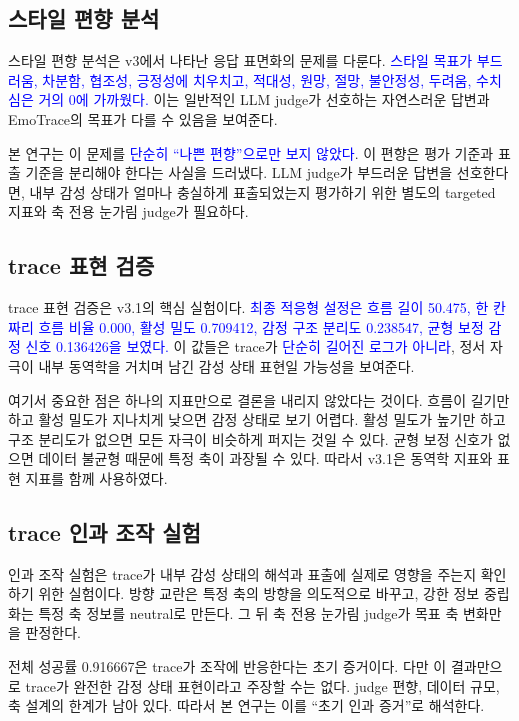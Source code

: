 ﻿\documentclass[11pt,a4paper]{article}
\begin{document}
\subsection{스타일 편향 분석}

스타일 편향 분석은 v3에서 나타난 응답 표면화의 문제를 다룬다. \textcolor{blue}{스타일 목표가 부드러움, 차분함, 협조성, 긍정성에 치우치고, 적대성, 원망, 절망, 불안정성, 두려움, 수치심은 거의 0에 가까웠다.} 이는 일반적인 LLM judge가 선호하는 자연스러운 답변과 EmoTrace의 목표가 다를 수 있음을 보여준다.

본 연구는 이 문제를 \textcolor{blue}{단순히 ``나쁜 편향''으로만 보지 않았다}. 이 편향은 평가 기준과 표출 기준을 분리해야 한다는 사실을 드러냈다. LLM judge가 부드러운 답변을 선호한다면, 내부 감성 상태가 얼마나 충실하게 표출되었는지 평가하기 위한 별도의 targeted 지표와 축 전용 눈가림 judge가 필요하다.

\subsection{trace 표현 검증}

trace 표현 검증은 v3.1의 핵심 실험이다. \textcolor{blue}{최종 적응형 설정은 흐름 길이 50.475, 한 칸짜리 흐름 비율 0.000, 활성 밀도 0.709412, 감정 구조 분리도 0.238547, 균형 보정 감정 신호 0.136426을 보였다.} 이 값들은 trace가 \textcolor{blue}{단순히 길어진 로그가 아니라}, 정서 자극이 내부 동역학을 거치며 남긴 감성 상태 표현일 가능성을 보여준다.

여기서 중요한 점은 하나의 지표만으로 결론을 내리지 않았다는 것이다. 흐름이 길기만 하고 활성 밀도가 지나치게 낮으면 감정 상태로 보기 어렵다. 활성 밀도가 높기만 하고 구조 분리도가 없으면 모든 자극이 비슷하게 퍼지는 것일 수 있다. 균형 보정 신호가 없으면 데이터 불균형 때문에 특정 축이 과장될 수 있다. 따라서 v3.1은 동역학 지표와 표현 지표를 함께 사용하였다.

\subsection{trace 인과 조작 실험}

인과 조작 실험은 trace가 내부 감성 상태의 해석과 표출에 실제로 영향을 주는지 확인하기 위한 실험이다. 방향 교란은 특정 축의 방향을 의도적으로 바꾸고, 강한 정보 중립화는 특정 축 정보를 neutral로 만든다. 그 뒤 축 전용 눈가림 judge가 목표 축 변화만을 판정한다.

전체 성공률 0.916667은 trace가 조작에 반응한다는 초기 증거이다. 다만 이 결과만으로 trace가 완전한 감정 상태 표현이라고 주장할 수는 없다. judge 편향, 데이터 규모, 축 설계의 한계가 남아 있다. 따라서 본 연구는 이를 ``초기 인과 증거''로 해석한다.
\end{document}
